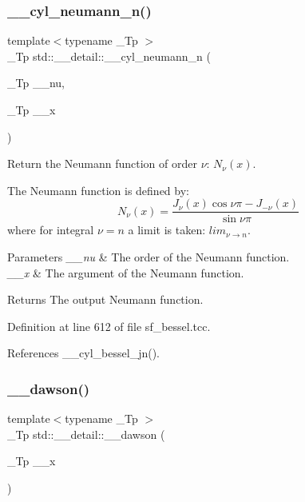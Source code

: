 \subsubsection{\texorpdfstring{\+\_\+\+\_\+cyl\+\_\+neumann\+\_\+n()}{\_\_cyl\_neumann\_n()}}
{\footnotesize\ttfamily template$<$typename \+\_\+\+Tp $>$ \\
\+\_\+\+Tp std\+::\+\_\+\+\_\+detail\+::\+\_\+\+\_\+cyl\+\_\+neumann\+\_\+n (\begin{DoxyParamCaption}\item[{\+\_\+\+Tp}]{\+\_\+\+\_\+nu,  }\item[{\+\_\+\+Tp}]{\+\_\+\+\_\+x }\end{DoxyParamCaption})}



Return the Neumann function of order $ \nu $\+: $ N_{\nu}(x) $. 

The Neumann function is defined by\+: \[ N_{\nu}(x) = \frac{J_{\nu}(x) \cos \nu\pi - J_{-\nu}(x)} {\sin \nu\pi} \] where for integral $ \nu = n $ a limit is taken\+: $ lim_{\nu \to n} $.


\begin{DoxyParams}{Parameters}
{\em \+\_\+\+\_\+nu} & The order of the Neumann function. \\
\hline
{\em \+\_\+\+\_\+x} & The argument of the Neumann function. \\
\hline
\end{DoxyParams}
\begin{DoxyReturn}{Returns}
The output Neumann function. 
\end{DoxyReturn}


Definition at line 612 of file sf\+\_\+bessel.\+tcc.



References \+\_\+\+\_\+cyl\+\_\+bessel\+\_\+jn().

\mbox{\label{namespacestd_1_1____detail_a6384fb4c5af31b41a38c120869a548c7}} 
\subsubsection{\texorpdfstring{\+\_\+\+\_\+dawson()}{\_\_dawson()}}
{\footnotesize\ttfamily template$<$typename \+\_\+\+Tp $>$ \\
\+\_\+\+Tp std\+::\+\_\+\+\_\+detail\+::\+\_\+\+\_\+dawson (\begin{DoxyParamCaption}\item[{\+\_\+\+Tp}]{\+\_\+\+\_\+x }\end{DoxyParamCaption})}



